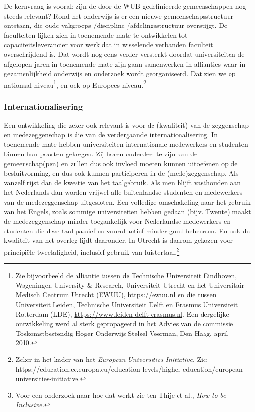\documentclass[smallauthor, chapterhaspagenum, nochapterinheader, pagenuminheader,  bigchapnum,medium2, tocpages, garamond, titleinheader]{jote-book}
\begin{document}
	De kernvraag is vooral: zijn de door de WUB gedefinieerde gemeenschappen nog steeds relevant? Rond het onderwijs is er een nieuwe gemeenschapsstructuur ontstaan, die oude vakgroeps-/discipline-/afdelingsstructuur overstijgt. De faculteiten lijken zich in toenemende mate te ontwikkelen tot capaciteitsleverancier voor werk dat in wisselende verbanden faculteit overschrijdend is. Dat wordt nog eens verder versterkt doordat universiteiten de afgelopen jaren in toenemende mate zijn gaan samenwerken in allianties waar in gezamenlijkheid onderwijs en onderzoek wordt georganiseerd. Dat zien we op nationaal niveau\footnote{Zie bijvoorbeeld de alliantie tussen de Technische Universiteit Eindhoven, Wageningen University \& Research, Universiteit Utrecht en het Universitair Medisch Centrum Utrecht (EWUU), \href{https://www.leiden-delft-erasmus.nl}{https://ewuu.nl} en die tussen Universiteit Leiden, Technische Universiteit Delft en Erasmus Universiteit Rotterdam (LDE), \href{https://www.nederlandrechtsstaat.nl/academische-vrijheid-in-tijden-van-wakkerte-en-cancelcultuur/}{https://www.leiden-delft-erasmus.nl}. Een dergelijke ontwikkeling werd al sterk gepropageerd in het Advies van de commissie Toekomstbestendig Hoger Onderwijs Stelsel Veerman, Den Haag, april 2010.}, en ook op Europees niveau.\footnote{Zeker in het kader van het \emph{European }\emph{Universities}\emph{ }\emph{Initiative}. Zie: https://education.ec.europa.eu/education-levels/higher-education/european-universities-initiative.}



	\subsubsection{Internationalisering}



	Een ontwikkeling die zeker ook relevant is voor de (kwaliteit) van de zeggenschap en medezeggenschap is die van de verdergaande internationalisering. In toenemende mate hebben universiteiten internationale medewerkers en studenten binnen hun poorten gekregen. Zij horen onderdeel te zijn van de gemeenschap(pen) en zullen dus ook invloed moeten kunnen uitoefenen op de besluitvorming, en dus ook kunnen participeren in de (mede)zeggenschap. Als vanzelf rijst dan de kwestie van het taalgebruik. Als men blijft vasthouden aan het Nederlands dan worden vrijwel alle buitenlandse studenten en medewerkers van de medezeggenschap uitgesloten. Een volledige omschakeling naar het gebruik van het Engels, zoals sommige universiteiten hebben gedaan (bijv. Twente) maakt de medezeggenschap minder toegankelijk voor Nederlandse medewerkers en studenten die deze taal passief en vooral actief minder goed beheersen. En ook de kwaliteit van het overleg lijdt daaronder. In Utrecht is daarom gekozen voor principiële tweetaligheid, inclusief gebruik van luistertaal.\footnote{Voor een onderzoek naar hoe dat werkt zie ten Thije et al., \emph{How }\emph{to}\emph{ }\emph{be}\emph{ }\emph{Inclusive}\emph{.}}
\end{document}
